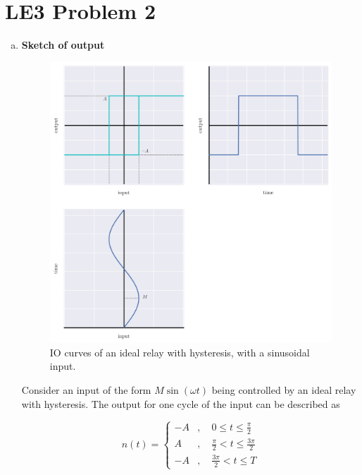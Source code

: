 \documentclass[12pt,a4paper]{article}
\begin{document}
\setcounter{page}{1}

\section*{LE3 Problem 2}
\bigskip

\begin{enumerate}[a)]

\item \textbf{Sketch of output}

\begin{figure}[h!]
	\centering
	\includegraphics[width=\linewidth]{LE3_io.png}
	\caption{IO curves of an ideal relay with hysteresis, with a sinusoidal input.}
	\label{fig:desc-hysteresis}
\end{figure}

Consider an input of the form $M\sin(\omega t)$ being controlled by an ideal relay with hysteresis. The output for one cycle of the input can be described as

\begin{equation}
	n(t) =
	\begin{cases}
		-A & , \quad 0 \leq t \leq \frac{\pi}{2} \\
		A & , \quad \frac{\pi}{2} < t \leq \frac{3\pi}{2} \\
		-A & , \quad \frac{3\pi}{2} < t \leq T
	\end{cases} \label{eq:output}
\end{equation}


\end{enumerate}
\end{document}

